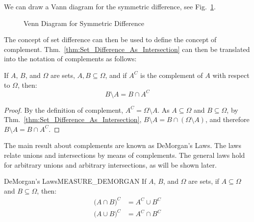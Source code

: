         We can draw a Vann diagram for the symmetric difference, see
        Fig.~\ref{fig:Sym_Diff_Venn_Diagram}.
        \begin{figure}[H]
            \centering
            \captionsetup{type=figure}
            
            \caption{Venn Diagram for Symmetric Difference}
            \label{fig:Sym_Diff_Venn_Diagram}
        \end{figure}
        The concept of set difference can then be used to define the
        concept of complement.
        Thm.~\ref{thm:Set_Difference_As_Intersection} can then be
        translated into the notation of complements as follows:
        \begin{theorem}
            If $A$, $B$, and $\Omega$ are sets,
            $A,B\subseteq\Omega$, and if $A^{C}$ is the
            complement of $A$ with respect to $\Omega$, then:
            \begin{equation}
                B\setminus{A}=B\cap{A}^{C}
            \end{equation}
        \end{theorem}
        \begin{proof}
            By the definition of complement,
            $A^{C}=\Omega\setminus{A}$.
            As $A\subseteq\Omega$ and $B\subseteq\Omega$, by
            Thm.~\ref{thm:Set_Difference_As_Intersection},
            $B\setminus{A}=B\cap(\Omega\setminus{A})$,
            and therefore $B\setminus{A}=B\cap{A}^{C}$.
        \end{proof}
        The main result about complements are known as
        DeMorgan's Laws. The laws relate unions and
        intersections by means of complements. The general
        laws hold for arbitrary unions and arbitrary
        intersections, as will be shown later.
        \begin{ftheorem}{DeMorgan's Laws}{MEASURE_DEMORGAN}
            If $A$, $B$, and $\Omega$ are sets, if
            $A\subseteq\Omega$ and $B\subseteq\Omega$, then:
            \begin{subequations}
                \begin{align}
                    \big(A\cap{B}\big)^{C}
                    &=A^{C}\cup{B}^{C}\\
                    \big(A\cup{B}\big)^{C}
                    &=A^{C}\cap{B}^{C}
                \end{align}
            \end{subequations}
        \end{ftheorem}
